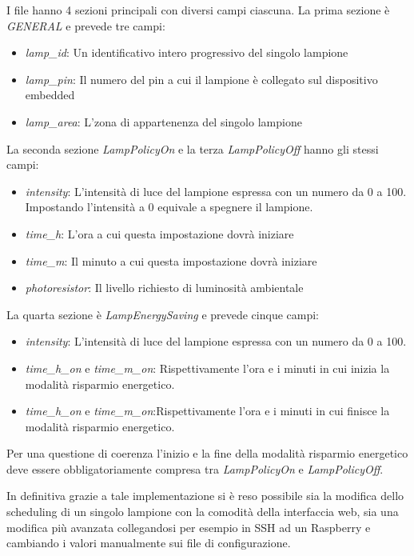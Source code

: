 I file hanno 4 sezioni principali con diversi campi ciascuna.
La prima sezione è \textit{GENERAL} e prevede tre campi:
\begin{itemize}
	\item \textit{lamp\_id}: Un identificativo intero progressivo del singolo lampione
	\item \textit{lamp\_pin}: Il numero del pin a cui il lampione è collegato sul dispositivo embedded
	\item \textit{lamp\_area}: L'zona di appartenenza del singolo lampione
\end{itemize}

La seconda sezione \textit{LampPolicyOn} e la terza \textit{LampPolicyOff} hanno gli stessi campi:
\begin{itemize}
	\item \textit{intensity}: L'intensità di luce del lampione espressa con un numero da 0 a 100. Impostando l'intensità a 0 equivale a spegnere il lampione.
	\item \textit{time\_h}: L'ora a cui questa impostazione dovrà iniziare
	\item \textit{time\_m}: Il minuto a cui questa impostazione dovrà iniziare
	\item \textit{photoresistor}: Il livello richiesto di luminosità ambientale
\end{itemize}

La quarta sezione è \textit{LampEnergySaving} e prevede cinque campi:
\begin{itemize}
	\item \textit{intensity}: L'intensità di luce del lampione espressa con un numero da 0 a 100.
	\item \textit{time\_h\_on} e \textit{time\_m\_on}: Rispettivamente l'ora e i minuti in cui inizia la modalità risparmio energetico.
	\item \textit{time\_h\_on} e \textit{time\_m\_on}:Rispettivamente l'ora e i minuti in cui finisce la modalità risparmio energetico.
\end{itemize}

Per una questione di coerenza l'inizio e la fine della modalità risparmio energetico deve essere obbligatoriamente compresa tra \textit{LampPolicyOn} e \textit{LampPolicyOff}.

In definitiva grazie a tale implementazione si è reso possibile sia la modifica dello scheduling di un singolo lampione con la comodità della interfaccia web, sia una modifica più avanzata collegandosi per esempio in SSH ad un Raspberry e cambiando i valori manualmente sui file di configurazione.

